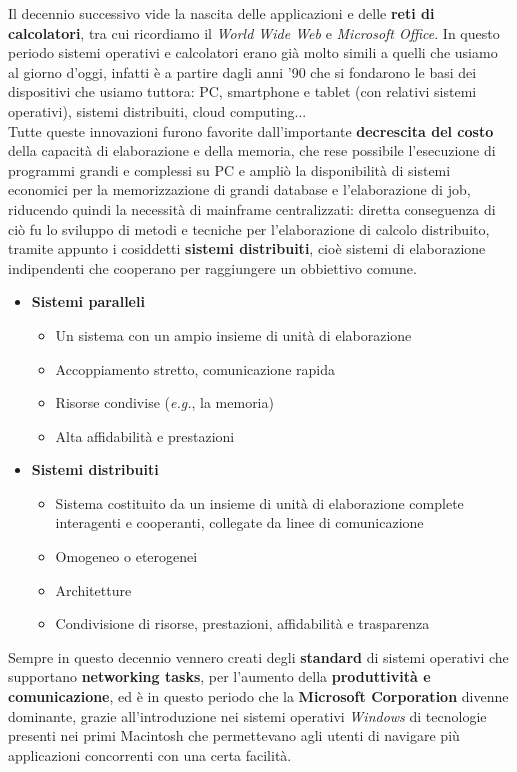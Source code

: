 \documentclass[12pt, letterpaper]{article}
\begin{document}
Il decennio successivo vide la nascita delle applicazioni e delle \textbf{reti di calcolatori}, tra cui ricordiamo il \textit{World Wide Web} e \textit{Microsoft Office}. In questo periodo sistemi operativi e calcolatori erano già molto simili a quelli che usiamo al giorno d'oggi, infatti è a partire dagli anni '90 che si fondarono le basi dei dispositivi che usiamo tuttora: PC, smartphone e tablet (con relativi sistemi operativi), sistemi distribuiti, cloud computing... \\
Tutte queste innovazioni furono favorite dall'importante \textbf{decrescita del costo} della capacità di elaborazione e della memoria, che rese possibile l'esecuzione di programmi grandi e complessi su PC e ampliò la disponibilità di sistemi economici per la memorizzazione di grandi database e l'elaborazione di job, riducendo quindi la necessità di mainframe centralizzati: diretta conseguenza di ciò fu lo sviluppo di metodi e tecniche per l'elaborazione di calcolo distribuito, tramite appunto i cosiddetti \textbf{sistemi distribuiti}, cioè sistemi di elaborazione indipendenti che cooperano per raggiungere un obbiettivo comune.
\begin{itemize}
    \item \textbf{Sistemi paralleli}
        \begin{itemize}
                \item Un sistema con un ampio insieme di unità di elaborazione
                \item Accoppiamento stretto, comunicazione rapida
                \item Risorse condivise (\textit{e.g.}, la memoria)
                \item Alta affidabilità e prestazioni
        \end{itemize}
    \item \textbf{Sistemi distribuiti}
        \begin{itemize}
                \item Sistema costituito da un insieme di unità di elaborazione complete interagenti e cooperanti, collegate da linee di comunicazione
                \item Omogeneo o eterogenei
                \item Architetture
                \item Condivisione di risorse, prestazioni, affidabilità e trasparenza
        \end{itemize}
\end{itemize}
Sempre in questo decennio vennero creati degli \textbf{standard} di sistemi operativi che supportano \textbf{networking tasks}, per l'aumento della \textbf{produttività e comunicazione}, ed è in questo periodo che la \textbf{Microsoft Corporation} divenne dominante, grazie all'introduzione nei sistemi operativi \textit{Windows} di tecnologie presenti nei primi Macintosh che permettevano agli utenti di navigare più applicazioni concorrenti con una certa facilità. \\ \\
\end{document}
